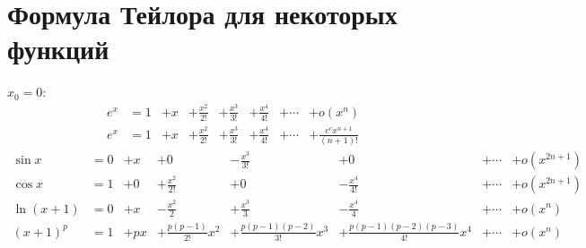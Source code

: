 ﻿\section{Формула Тейлора для некоторых функций}
$x_0 = 0$:
\begin{align*}
e^x &= 1 &+ x &+ \frac{x^2}{2!} &+ \frac{x^3}{3!} &+ \frac{x^4}{4!} &+ \cdots &+ o(x^n) \\
e^x &= 1 &+ x &+ \frac{x^2}{2!} &+ \frac{x^3}{3!} &+ \frac{x^4}{4!} &+ \cdots &+ \frac{e^cx^{n+1}}{(n+1)!}
\end{align*}
\begin{align*}
\sin x &= 0 &+ x &+ 0 &- \frac{x^3}{3!} &+ 0 &+ \cdots &+ o(x^{2n+1}) \\
\cos x &= 1 &+ 0 &+ \frac{x^2}{2!} &+ 0 &- \frac{x^4}{4!} &+ \cdots &+ o(x^{2n+1}) \\
\ln (x+1) &= 0 &+ x &- \frac{x^2}2 &+ \frac{x^3}3 &- \frac{x^4}4 &+ \cdots &+ o(x^n) \\
(x+1)^p &= 1 &+ px &+ \frac{p(p-1)}{2!}x^2 &+ \frac{p(p-1)(p-2)}{3!}x^3 &+ \frac{p(p-1)(p-2)(p-3)}{4!}x^4 &+ \cdots &+ o(x^n)
\end{align*}
